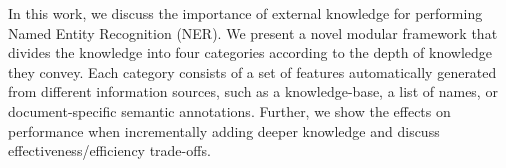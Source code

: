 In this work, we discuss the importance of external knowledge for performing Named Entity Recognition (NER). We present a novel modular framework that divides the knowledge into four categories according to the depth of knowledge they convey.  Each category consists of a set of features automatically generated from different information sources, such as a knowledge-base, a list of names, or document-specific semantic annotations. Further, we show the effects on performance when incrementally adding deeper knowledge and discuss effectiveness/efficiency trade-offs.
